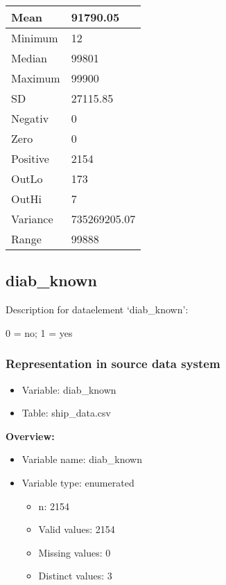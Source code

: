 \documentclass[
]{article}
\providecommand{\tightlist}{%
  \setlength{\itemsep}{0pt}\setlength{\parskip}{0pt}}
\begin{document}
\begin{table}[H]
\centering
\begin{tabular}{l|l}
\hline
Mean & 91790.05\\
\hline
Minimum & 12\\
\hline
Median & 99801\\
\hline
Maximum & 99900\\
\hline
SD & 27115.85\\
\hline
Negativ & 0\\
\hline
Zero & 0\\
\hline
Positive & 2154\\
\hline
OutLo & 173\\
\hline
OutHi & 7\\
\hline
Variance & 735269205.07\\
\hline
Range & 99888\\
\hline
\end{tabular}
\end{table}
\newpage

\hypertarget{diab_known}{%
\subsection{diab\_known}\label{diab_known}}

Description for dataelement `diab\_known':

0 = no; 1 = yes

\hypertarget{representation-in-source-data-system-9}{%
\subsubsection{\texorpdfstring{Representation in \textbf{source} data
system}{Representation in source data system}}\label{representation-in-source-data-system-9}}

\begin{itemize}
\tightlist
\item
  Variable: diab\_known
\item
  Table: ship\_data.csv
\end{itemize}

\textbf{Overview:}

\begin{itemize}
\tightlist
\item
  Variable name: diab\_known
\item
  Variable type: enumerated

  \begin{itemize}
  \tightlist
  \item
    n: 2154
  \item
    Valid values: 2154
  \item
    Missing values: 0
  \item
    Distinct values: 3
  \end{itemize}
\end{itemize}
\end{document}
